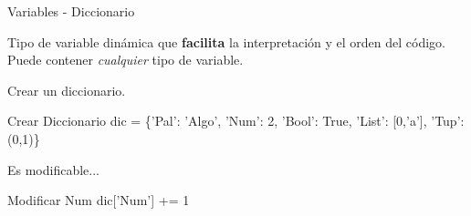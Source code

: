 \begin{frame}[t]{Variables - Diccionario}\vspace{10pt}

Tipo de variable dinámica que \textbf{facilita} la interpretación y el orden del código. Puede contener \textit{cualquier} tipo de variable.

\vspace{5 pt}
Crear un diccionario.
\begin{block}{Crear Diccionario}
dic = \{'Pal': 'Algo', 'Num': 2, 'Bool': True, 'List': [0,'a'], 'Tup': (0,1)\}
\end{block}

Es modificable...
\begin{block}{Modificar Num}
dic['Num'] += 1
\end{block}


\end{frame}